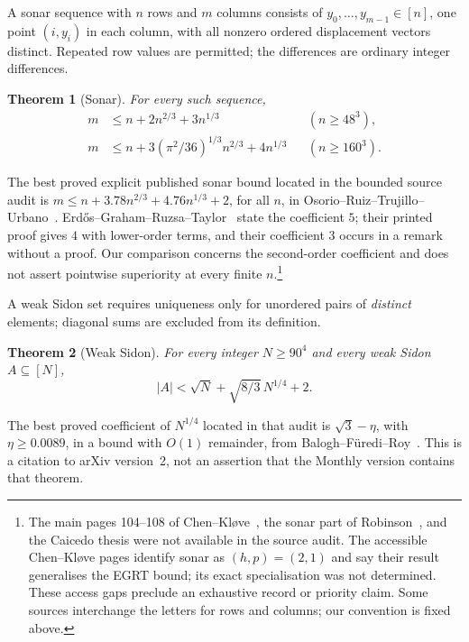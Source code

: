 \documentclass[10pt]{article}
\numberwithin{equation}{section}
\newtheorem{theorem}{Theorem}[section]
\theoremstyle{remark}
\begin{document}
A sonar sequence with $n$ rows and $m$ columns consists of
$y_0,\ldots,y_{m-1}\in[n]$, one point $(i,y_i)$ in each column, with
all nonzero ordered displacement vectors distinct. Repeated row values
are permitted; the differences are ordinary integer differences.
\begin{theorem}[Sonar]\label{thm:sonar}
For every such sequence,
\begin{align}
 m&\le n+2n^{2/3}+3n^{1/3} &&(n\ge48^3),\label{eq:sonar-ramp}\\
 m&\le n+3(\pi^2/36)^{1/3}n^{2/3}+4n^{1/3} &&(n\ge160^3).\label{eq:sonar-cos}
\end{align}
\end{theorem}
The best proved explicit published sonar bound located in the bounded
source audit is $m\le n+3.78n^{2/3}+4.76n^{1/3}+2$, for all $n$,
in Osorio--Ruiz--Trujillo--Urbano~\cite[Theorem~2.1]{ORTU14}.
Erd\H{o}s--Graham--Ruzsa--Taylor~\cite[Theorem~4]{EGRT92} state the
coefficient $5$; their printed proof gives $4$ with lower-order terms,
and their coefficient $3$ occurs in a remark without a proof.
Our comparison concerns the second-order coefficient and does not
assert pointwise superiority at every finite $n$.\footnote{The main
pages 104--108 of Chen--Kl\o ve~\cite{CK96}, the sonar part of
Robinson~\cite{Rob85}, and the Caicedo thesis were not available in the
source audit. The accessible Chen--Kl\o ve pages identify sonar as
$(h,p)=(2,1)$ and say their result generalises the EGRT bound; its exact
specialisation was not determined. These access gaps preclude an
exhaustive record or priority claim. Some sources interchange the
letters for rows and columns; our convention is fixed above.}

A weak Sidon set requires uniqueness only for unordered pairs of
\emph{distinct} elements; diagonal sums are excluded from its definition.
\begin{theorem}[Weak Sidon]\label{thm:weak}
For every integer $N\ge90^4$ and every weak Sidon $A\subseteq[N]$,
\begin{equation}\label{eq:weak}
 |A|<\sqrt N+\sqrt{8/3}\,N^{1/4}+2.
\end{equation}
\end{theorem}
The best proved coefficient of $N^{1/4}$ located in that audit is $\sqrt3-\eta$,
with $\eta\ge0.0089$, in a bound with $O(1)$ remainder, from
Balogh--F\"uredi--Roy~\cite[Theorem~5.1]{BFR21}. This is a citation to
arXiv version~2, not an assertion that the Monthly version contains that theorem.
\end{document}
